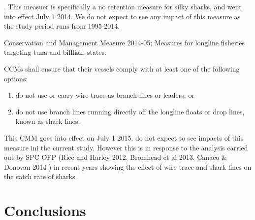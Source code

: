 \documentclass[12pt]{SCreport}
\begin{document}
\begin{description}
 
\item[CMM 2013-08 : Conservation and Management Measure for Silky Shark]. This measuer is specifically a no retention measure for silky sharks, and  went into effect July 1 2014. We do not expect to see any impact of this measure as the study period runs from 1995-2014.

\item  Conservation and Management Measure 2014-05; Measures for longline fisheries targeting tuna and billfish,  states: 

      CCMs shall ensure that their vessels comply with at least one of the following options:
        \begin{enumerate}
            \item  do not use or carry wire trace as branch lines or leaders; or
              \item  do not use branch lines running directly off the longline floats or drop lines, known as shark lines. 
           \end{enumerate}
This CMM goes into effect on July 1 2015. do not expect to see impacts of this measure ini the current study.  However this is in response to the analysis carried out by SPC OFP (Rice and Harley 2012, Bromhead et al 2013, Canaco \& Donovan 2014 )  in recent years showing the effect of wire trace and shark lines on the catch rate of sharks.

 \end{description}
 

\section{Conclusions }
\end{document}
